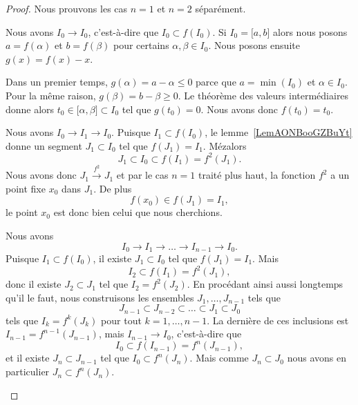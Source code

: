 \begin{proof}
	Nous prouvons les cas \( n=1\) et \( n=2\) séparément.
	\begin{subproof}
		\spitem[\( n=1\)]
		Nous avons \( I_0\to I_0\), c'est-à-dire que \( I_0\subset f(I_0)\). Si \( I_0=\mathopen[ a , b \mathclose]\) alors nous posons \( a=f(\alpha)\) et \( b=f(\beta)\) pour certains \( \alpha,\beta\in I_0\). Nous posons ensuite \( g(x)=f(x)-x\).

		Dans un premier temps, \( g(\alpha)=a-\alpha\leq 0\) parce que \( a=\min(I_0)\) et \( \alpha\in I_0\). Pour la même raison, \( g(\beta)=b-\beta\geq 0\). Le théorème des valeurs intermédiaires donne alors \( t_0\in \mathopen[ \alpha , \beta \mathclose]\subset I_0\) tel que \( g(t_0)=0\). Nous avons donc \( f(t_0)=t_0\).

		\spitem[\( n=2\)]
		Nous avons \( I_0\to I_1\to I_0\). Puisque \( I_1\subset f(I_0)\), le lemme~\ref{LemAONBooGZBuYt} donne un segment \( J_1\subset I_0\) tel que \( f(J_1)=I_1\). Mézalors
		\begin{equation}
			J_1\subset I_0\subset f(I_1)=f^2(J_1).
		\end{equation}
		Nous avons donc \( J_1\stackrel{f^2}{\longrightarrow}J_1\) et par le cas \( n=1\) traité plus haut, la fonction \( f^2 \) a un point fixe \( x_0\) dans \( J_1\). De plus
		\begin{equation}
			f(x_0)\in f(J_1)=I_1,
		\end{equation}
		le point \( x_0\) est donc bien celui que nous cherchions.

		Nous avons
		\begin{equation}
			I_0\to I_1\to\ldots\to I_{n-1}\to I_0.
		\end{equation}
		Puisque \( I_1\subset f(I_0)\), il existe \( J_1\subset I_0\) tel que \( f(J_1)=I_1\). Mais
		\begin{equation}
			I_2\subset f(I_1)=f^2(J_1),
		\end{equation}
		donc il existe \( J_2\subset J_1\) tel que \( I_2=f^2(J_2)\). En procédant ainsi aussi longtemps qu'il le faut, nous construisons les ensembles \( J_1,\ldots, J_{n-1}\) tels que
		\begin{equation}
			J_{n-1}\subset J_{n-2}\subset\ldots\subset J_1\subset J_0
		\end{equation}
		tels que \( I_k=f^k(J_k)\) pour tout \( k=1,\ldots, n-1\). La dernière de ces inclusions est \( I_{n-1}=f^{n-1}(J_{n-1})\), mais \( I_{n-1}\to I_0\), c'est-à-dire que
		\begin{equation}
			I_0\subset f(I_{n-1})=f^n(J_{n-1}),
		\end{equation}
		et il existe \( J_n\subset J_{n-1}\) tel que \( I_0\subset f^n(J_n)\). Mais comme \( J_n\subset J_0\) nous avons en particulier \( J_n\subset f^n(J_n)\).


\end{subproof}
\end{proof}
